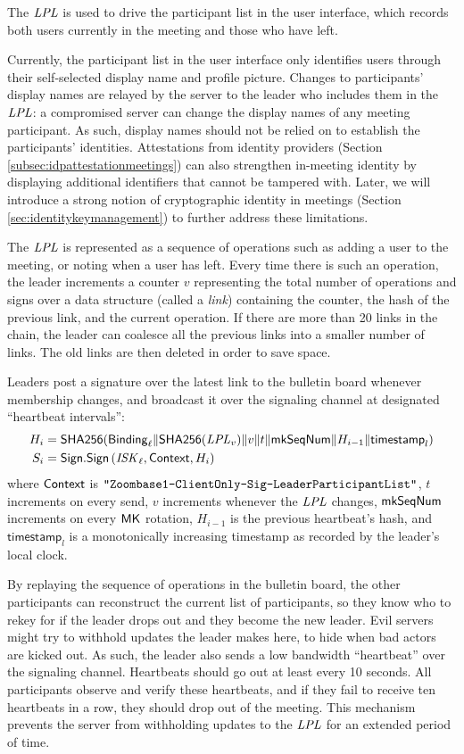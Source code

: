 The $\mathit{LPL}$ is used to drive the participant list in the user interface, which records both users
currently in the meeting and those who have left.

Currently, the participant list in the user interface only identifies users through their self-selected display name and
profile picture. Changes to participants' display names are relayed by the server to the leader who
includes them in the $\mathit{LPL}$: a compromised server can change the display names of any meeting
participant. As such, display names should not be relied on to establish the participants'
identities. Attestations from identity providers (Section \ref{subsec:idpattestationmeetings}) can also strengthen in-meeting identity by displaying additional identifiers that cannot be tampered with.
Later, we will introduce a strong notion of cryptographic identity in meetings (Section \ref{sec:identitykeymanagement}) to further address these limitations.

The $\mathit{LPL}$ is represented as a sequence of operations such as adding a user to the meeting, or
noting when a user has left. Every time there is such an operation, the leader increments a counter
$v$ representing the total number of operations and signs over a data structure (called a
\textit{link}) containing the counter, the hash of the previous link, and the current operation. If
there are more than 20 links in the chain, the leader can coalesce all the previous links into a
smaller number of links. The old links are then deleted in order to save space.

Leaders post a signature over the latest link to the bulletin board whenever membership changes, and
broadcast it over the signaling channel at designated ``heartbeat intervals'':
%
\begin{align*}
    H_i &= \mathsf{SHA256}({\sf Binding}_{\ell} \| \mathsf{SHA256}(\mathit{LPL}_v) \| v \| t \| \mathsf{mkSeqNum} \| H_{i-1} \| \textsf{timestamp}_l  ) \\
    S_i &= {\sf Sign}.\mathsf{Sign} \left(\mathit{ISK}_{\ell}, {\sf Context}, H_i \right)
\end{align*}
%
where ${\sf Context}$ is $\texttt{"Zoombase1-ClientOnly-Sig-Leader\-Participant\-List"}$, $t$ increments
on every send, $v$ increments whenever the $\mathit{LPL}$ changes, $\mathsf{mkSeqNum}$ increments on
every ${\sf MK}$ rotation, $H_{i-1}$ is the previous heartbeat's hash, and $\textsf{timestamp}_l$ is a monotonically increasing timestamp as recorded by the leader's local clock.

By replaying the sequence of operations in the bulletin board, the other participants can
reconstruct the current list of participants, so they know who to rekey for if the leader drops out
and they become the new leader. Evil servers might try to withhold updates the leader makes here, to
hide when bad actors are kicked out. As such, the leader also sends a low bandwidth ``heartbeat''
over the signaling channel. Heartbeats should go out at least every 10 seconds. All participants
observe and verify these heartbeats, and if they fail to receive ten heartbeats in a row, they
should drop out of the meeting. This mechanism prevents the server from withholding updates to the $\mathit{LPL}$ for
 an extended period of time.

